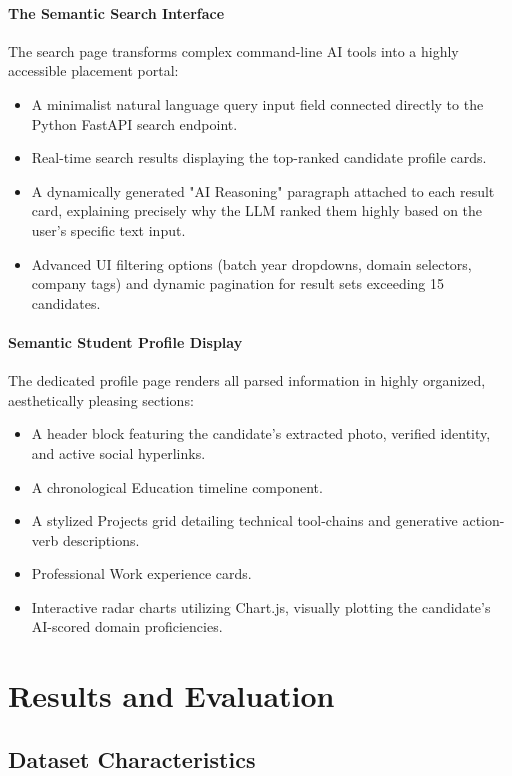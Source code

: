 \documentclass[12pt,a4paper]{report}
\begin{document}
\subsubsection{The Semantic Search Interface}
The search page transforms complex command-line AI tools into a highly accessible placement portal:
\begin{itemize}
    \item A minimalist natural language query input field connected directly to the Python FastAPI search endpoint.
    \item Real-time search results displaying the top-ranked candidate profile cards.
    \item A dynamically generated "AI Reasoning" paragraph attached to each result card, explaining precisely why the LLM ranked them highly based on the user's specific text input.
    \item Advanced UI filtering options (batch year dropdowns, domain selectors, company tags) and dynamic pagination for result sets exceeding 15 candidates.
\end{itemize}

\subsubsection{Semantic Student Profile Display}
The dedicated profile page renders all parsed information in highly organized, aesthetically pleasing sections:
\begin{itemize}
    \item A header block featuring the candidate's extracted photo, verified identity, and active social hyperlinks.
    \item A chronological Education timeline component.
    \item A stylized Projects grid detailing technical tool-chains and generative action-verb descriptions.
    \item Professional Work experience cards.
    \item Interactive radar charts utilizing Chart.js, visually plotting the candidate's AI-scored domain proficiencies.
\end{itemize}

\chapter{Results and Evaluation}

\section{Dataset Characteristics}
\end{document}
